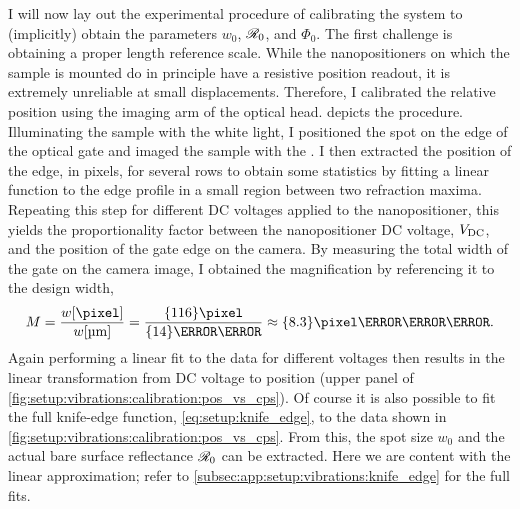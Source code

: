 I will now lay out the experimental procedure of calibrating the system to (implicitly) obtain the parameters $w_0$, $\mathscr{R}_0$, and $\Phi_0$.
The first challenge is obtaining a proper length reference scale.
While the nanopositioners on which the sample is mounted do in principle have a resistive position readout, it is extremely unreliable at small displacements.
Therefore, I calibrated the relative position using the imaging arm of the optical head.
 depicts the procedure.
Illuminating the sample with the white light, I positioned the spot on the edge of the optical gate and imaged the sample with the \cmoscam.
I then extracted the position of the edge, in pixels, for several rows to obtain some statistics by fitting a linear function to the edge profile in a small region between two refraction maxima.
Repeating this step for different DC voltages applied to the nanopositioner, this yields the proportionality factor between the nanopositioner DC voltage, $V_{\mathrm{DC}}$, and the position of the gate edge on the camera.
By measuring the total width of the gate on the camera image, I obtained the magnification by referencing it to the design width,
\begin{equation}\label{eq:setup:knife_edge:magnification}
    M = \frac{w[\unit{\pixel}]}{w[\unit{\micro\meter}]} = \frac{\qty{116}{\pixel}}{\qty{14}{\micro\meter}} \approx \qty{8.3}{\pixel\per\micro\meter}.
\end{equation}
Again performing a linear fit to the data for different voltages then results in the linear transformation from DC voltage to position (upper panel of \cref{fig:setup:vibrations:calibration:pos_vs_cps}).
Of course it is also possible to fit the full knife-edge function, \cref{eq:setup:knife_edge}, to the data shown in \cref{fig:setup:vibrations:calibration:pos_vs_cps}.
From this, the spot size $w_0$ and the actual bare  surface reflectance $\mathscr{R}_0$ can be extracted.
Here we are content with the linear approximation; refer to \cref{subsec:app:setup:vibrations:knife_edge} for the full fits.

